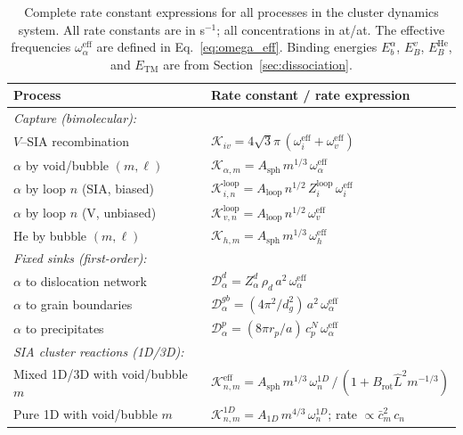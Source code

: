 \documentclass[pdflatex,sn-basic]{sn-jnl} %
\begin{document}
\begin{table}[htbp]
\centering
\caption{Complete rate constant expressions for all processes in the cluster
dynamics system. All rate constants are in s$^{-1}$; all concentrations in
at/at. The effective frequencies $\omega_\alpha^{\mathrm{eff}}$ are defined in
Eq.~\eqref{eq:omega_eff}. Binding energies $E_b^\alpha$, $E_B^v$,
$E_B^{\mathrm{He}}$, and $E_{\mathrm{TM}}$ are from
Section~\ref{sec:dissociation}.}
\label{tab:rate_summary_params}
\renewcommand{\arraystretch}{1.3}
\begin{tabular}{@{}p{3.8cm}l@{}}
\toprule
\textbf{Process} & \textbf{Rate constant / rate expression} \\
\midrule
\multicolumn{2}{l}{\emph{Capture (bimolecular):}} \\
$V$--SIA recombination
  & $\mathcal{K}_{iv} = 4\sqrt{3}\pi\,(\omega_i^{\mathrm{eff}} + \omega_v^{\mathrm{eff}})$ \\
$\alpha$ by void/bubble $(m,\ell)$
  & $\mathcal{K}_{\alpha,m} = A_{\mathrm{sph}}\,m^{1/3}\,\omega_\alpha^{\mathrm{eff}}$ \\
$\alpha$ by loop $n$ (SIA, biased)
  & $\mathcal{K}_{i,n}^{\mathrm{loop}} = A_{\mathrm{loop}}\,n^{1/2}\,Z_i^{\mathrm{loop}}\,\omega_i^{\mathrm{eff}}$ \\
$\alpha$ by loop $n$ (V, unbiased)
  & $\mathcal{K}_{v,n}^{\mathrm{loop}} = A_{\mathrm{loop}}\,n^{1/2}\,\omega_v^{\mathrm{eff}}$ \\
He by bubble $(m,\ell)$
  & $\mathcal{K}_{h,m} = A_{\mathrm{sph}}\,m^{1/3}\,\omega_h^{\mathrm{eff}}$ \\[3pt]

\multicolumn{2}{l}{\emph{Fixed sinks (first-order):}} \\
$\alpha$ to dislocation network
  & $\mathcal{D}_\alpha^d = Z_\alpha^d\,\rho_d\,a^2\,\omega_\alpha^{\mathrm{eff}}$ \\
$\alpha$ to grain boundaries
  & $\mathcal{D}_\alpha^{gb} = (4\pi^2/d_g^2)\,a^2\,\omega_\alpha^{\mathrm{eff}}$ \\
$\alpha$ to precipitates
  & $\mathcal{D}_\alpha^p = (8\pi r_p/a)\,c_p^N\,\omega_\alpha^{\mathrm{eff}}$ \\[3pt]

\multicolumn{2}{l}{\emph{SIA cluster reactions (1D/3D):}} \\
Mixed 1D/3D with void/bubble $m$
  & $\mathcal{K}_{n,m}^{\mathrm{eff}} = A_{\mathrm{sph}}\,m^{1/3}\,\omega_n^{1D}\,\big/\,
    (1 + B_{\mathrm{rot}}\hat{L}^2 m^{-1/3})$ \\
Pure 1D with void/bubble $m$
  & $\mathcal{K}_{n,m}^{1D} = A_{1D}\,m^{4/3}\,\omega_n^{1D}$;
    \; rate $\propto \bar{c}_m^2\,c_n$ \\[3pt]


\end{tabular}
\end{table}
\end{document}
